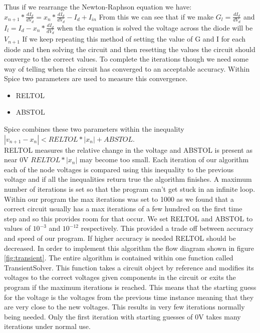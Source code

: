 \documentclass{article}
\begin{document}
\bigbreak
Thus if we rearrange the Newton-Raphson equation we have:\bigbreak
$x_{n+1}*\frac{d I_d}{d V_d} = x_n*\frac{d I_d}{d V_d} - I_d + I_{in}$\bigbreak
From this we can see that if we make $G_l = \frac{d I_d}{d V_d}$ and $I_l = I_d - x_n*\frac{d I_d}{d V_d}$ when the equation is solved the voltage across the diode will be $V_{n+1}$\bigbreak
If we keep repeating this method of setting the value of G and I for each diode and then solving the circuit and then resetting the values the circuit should converge to the correct values. To complete the iterations though we need some way of telling when the circuit has converged to an acceptable accuracy. 
Within Spice two parameters are used to measure this convergence.
\begin{itemize}
    \item RELTOL
    \item ABSTOL
\end{itemize}
Spice combines these two parameters within the inequality $|v_{n+1}-x_n| < RELTOL*|x_n| + ABSTOL$.\\
RELTOL measures the relative change in the voltage and ABSTOL is present as near 0V $RELTOL*|x_n|$ may become too small. Each iteration of our algorithm each of the node voltages is compared using this inequality to the previous voltage and if all the inequalities return true the algorithm finishes. A maximum number of iterations is set so that the program can't get stuck in an infinite loop. Within our program the max iterations was set to 1000 as we found that a correct circuit usually has a max iterations of a few hundred on the first time step and so this provides room for that occur. We set RELTOL and ABSTOL to values of $10^{-3}$ and $10^{-12}$ respectively. This provided a trade off between accuracy and speed of our program. If higher accuracy is needed RELTOL should be decreased. 
\bigbreak
In order to implement this algorithm the flow diagram shown in figure \ref{fig:transient}. The entire algorithm is contained within one function called TransientSolver. This function takes a circuit object by reference and modifies its voltages to the correct voltages given components in the circuit or exits the program if the maximum iterations is reached. This means that the starting guess for the voltage is the voltages from the previous time instance meaning that they are very close to the new voltages. This results in very few iterations normally being needed. Only the first iteration with starting guesses of 0V takes many iterations under normal use. \\
\end{document}
